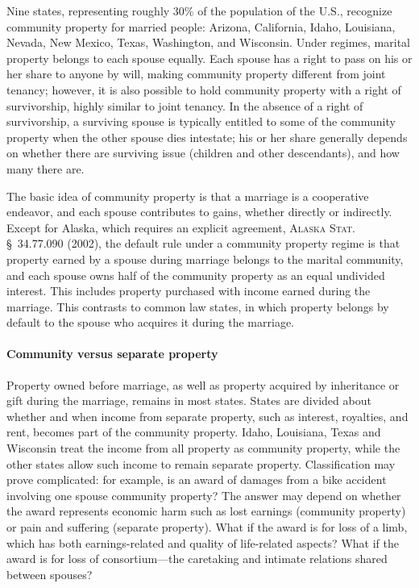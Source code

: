 Nine states, representing roughly 30\% of the population of the U.S., recognize
community property for married people: Arizona, California, Idaho, Louisiana,
Nevada, New Mexico, Texas, Washington, and Wisconsin. Under 
regimes, marital property belongs to each spouse equally. Each spouse has a
right to pass on his or her share to anyone by will, making community property
different from joint tenancy; however, it is also possible to hold community
property with a right of survivorship, highly similar to joint tenancy. In the
absence of a right of survivorship, a surviving spouse is typically entitled to
some of the community property when the other spouse dies intestate; his or her
share generally depends on whether there are surviving issue (children and
other descendants), and how many there are.

The basic idea of community property is that a marriage is a cooperative
endeavor, and each spouse contributes to gains, whether directly or indirectly.
Except for Alaska, which requires an explicit agreement, \textsc{Alaska Stat.} \S~34.77.090 (2002), the default rule under a community property regime is that
property earned by a spouse during marriage belongs to the marital community,
and each spouse owns half of the community property as an equal undivided
interest. This includes property purchased with income earned during the
marriage. This contrasts to common law states, in which property belongs by
default to the spouse who acquires it during the marriage.

\paragraph{Community versus separate property}
Property owned before marriage, as well as property acquired by inheritance or
gift during the marriage, remains  in most states.
States are
divided about whether and when income from separate property, such as interest,
royalties, and rent, becomes part of the community property. Idaho, Louisiana,
Texas and Wisconsin treat the income from all property as community property,
while the other states allow such income to remain separate property.
Classification may prove complicated: for example, is an award of damages from
a bike accident involving one spouse community property? The answer may depend
on whether the award represents economic harm such as lost earnings (community
property) or pain and suffering (separate property). What if the award is for
loss of a limb, which has both earnings-related and quality of life-related
aspects? What if the award is for loss of consortium---the caretaking and
intimate relations shared between spouses?

